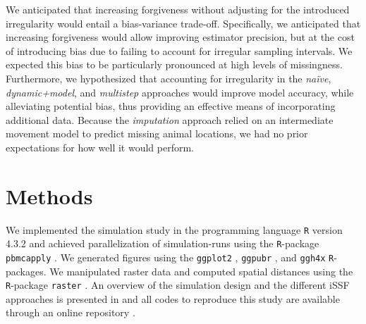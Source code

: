 \documentclass[abstract=on,10pt,a4paper,bibliography=totocnumbered]{article}
\begin{document}
We anticipated that increasing forgiveness without adjusting for the introduced
irregularity would entail a bias-variance trade-off. Specifically, we
anticipated that increasing forgiveness would allow improving estimator
precision, but at the cost of introducing bias due to failing to account for
irregular sampling intervals. We expected this bias to be particularly
pronounced at high levels of missingness. Furthermore, we hypothesized that
accounting for irregularity in the \textit{na\"ive}, \textit{dynamic+model}, and
\textit{multistep} approaches would improve model accuracy, while alleviating
potential bias, thus providing an effective means of incorporating additional
data. Because the \textit{imputation} approach relied on an intermediate
movement model to predict missing animal locations, we had no prior expectations
for how well it would perform.

\section{Methods}

We implemented the simulation study in the programming language \texttt{R}
version 4.3.2 \citep{RCoreTeam.2023} and achieved parallelization of
simulation-runs using the \texttt{R}-package \texttt{pbmcapply}
\citep{Kuang.2022}. We generated figures using the \texttt{ggplot2}
\citep{Wickham.2023}, \texttt{ggpubr} \citep{Kassambara.2023}, and
\texttt{ggh4x} \citep{Brand.2023} \texttt{R}-packages. We manipulated raster
data and computed spatial distances using the \texttt{R}-package \texttt{raster}
\citep{Hijmans.2023}. An overview of the simulation design and the different
iSSF approaches is presented in  and all codes to reproduce this
study are available through an online repository \citep{Hofmann.2023a}.
\end{document}
